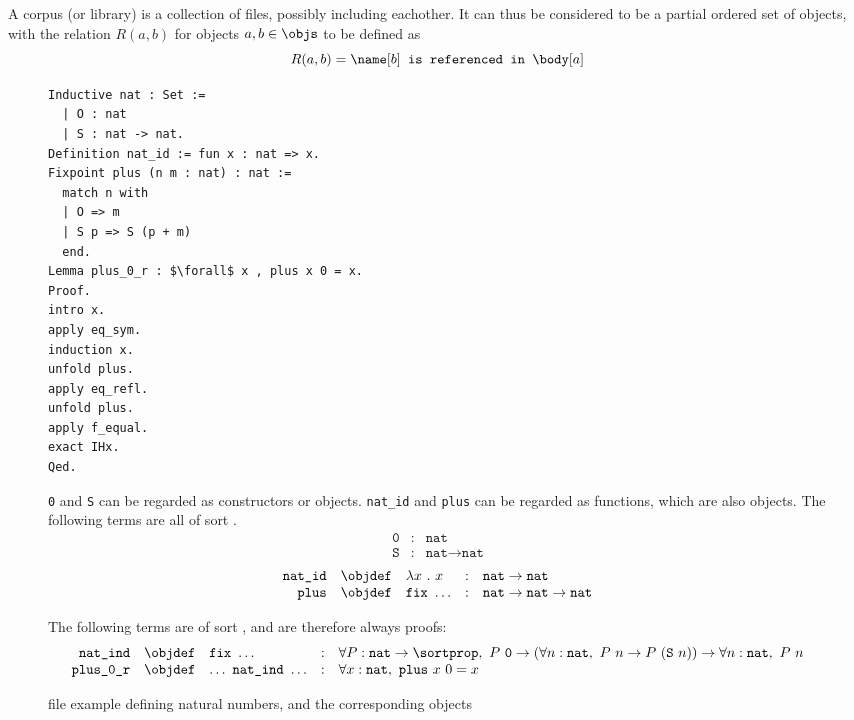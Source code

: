 A \coq corpus (or library) is a collection of \coq files, possibly including eachother.
It can thus be considered to be a partial ordered set of \coq objects, with the relation $R(a,b)$ for \coq objects $a, b \in \objs$ to be defined as
\[R(a,b) = \name[b] \texttt{~is referenced in~} \body[a]\]

\begin{figure}[H]
	\begin{lstlisting}[language=Coq, mathescape]
Inductive nat : Set :=
  | O : nat
  | S : nat -> nat.
Definition nat_id := fun x : nat => x.
Fixpoint plus (n m : nat) : nat :=
  match n with
  | O => m
  | S p => S (p + m)
  end.
Lemma plus_0_r : $\forall$ x , plus x 0 = x.
Proof.
intro x.
apply eq_sym.
induction x.
unfold plus.
apply eq_refl.
unfold plus.
apply f_equal.
exact IHx.
Qed.
	\end{lstlisting}
	\texttt{0} and \texttt{S} can be regarded as constructors or objects. \texttt{nat\_id} and \texttt{plus} can be regarded as functions, which are also objects.
	The following terms are all of sort \sortset.
	$$
		\begin{array}{rcl}
			\texttt{0} & : & \texttt{nat} \\
			\texttt{S} & : & \texttt{nat} \rightarrow \texttt{nat}
		\end{array}
	$$
	$$
		\begin{array}{rclcl}
			\texttt{nat\_id} & \objdef & \lambda x~.~x & : & \texttt{nat} \rightarrow \texttt{nat} \\
			\texttt{plus} & \objdef & \texttt{fix}~\ldots & : & \texttt{nat} \rightarrow \texttt{nat} \rightarrow \texttt{nat} \\
		\end{array}
	$$

	The following terms are of sort \sortprop, and are therefore always proofs:
	$$
		\begin{array}{rclcl}
			\texttt{nat\_ind} & \objdef & \texttt{fix}~\ldots & : &
				\forall P : \texttt{nat} \rightarrow \sortprop,~
				P~\texttt{0} \rightarrow (\forall n : \texttt{nat},~ P~n \rightarrow P~(\texttt{S}~n)) \rightarrow \forall n : \texttt{nat},~ P~n \\
			\texttt{plus\_0\_r} & \objdef & \ldots~\texttt{nat\_ind}~\ldots & : & \forall x : \texttt{nat},~ \texttt{plus}~x~0 = x
		\end{array}
	$$
	\caption{\coq file example defining natural numbers, and the corresponding \coq objects}
\end{figure}
